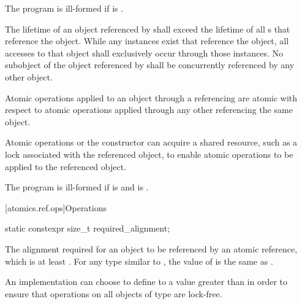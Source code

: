 \pnum
The program is ill-formed if  is .

\pnum
The lifetime of an object referenced by 
shall exceed the lifetime of all s that reference the object.
While any  instances exist
that reference the  object,
all accesses to that object shall exclusively occur
through those  instances.
No subobject of the object referenced by 
shall be concurrently referenced by any other  object.

\pnum
Atomic operations applied to an object
through a referencing  are atomic with respect to
atomic operations applied through any other 
referencing the same object.
\begin{note}
Atomic operations or the  constructor can acquire
a shared resource, such as a lock associated with the referenced object,
to enable atomic operations to be applied to the referenced object.
\end{note}

\pnum
The program is ill-formed
if  is  and
 is .

[atomics.ref.ops]{Operations}

%
%
%
%
\begin{itemdecl}
static constexpr size_t required_alignment;
\end{itemdecl}

\begin{itemdescr}
\pnum
The alignment required for an object to be referenced by an atomic reference,
which is at least .
For any type  similar to ,
the value of 
is the same as .

\pnum
\begin{note}
An implementation can choose to define
to a value greater than  in order to ensure that
operations on all objects of type  are lock-free.
\end{note}
\end{itemdescr}

